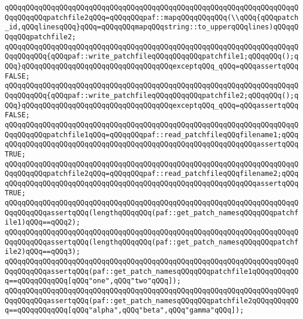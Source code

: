 \verb|qQQqqQQqqQQqqQQqqQQqqQQqqQQqqQQqqQQqqQQqqQQqqQQqqQQqqQQqqQQqqQQqqQQqqQQqqQQqqQQqpatchfile2qQQq=qQQqqQQqpaf::mapqQQqqQQqqQQq(\\qQQq{qQQqpatch_id,qQQqlinesqQQq}qQQq=qQQqqQQqmapqQQqstring::to_upperqQQqlines)qQQqqQQqqQQqpatchfile2;|\newline
\newline
\verb|qQQqqQQqqQQqqQQqqQQqqQQqqQQqqQQqqQQqqQQqqQQqqQQqqQQqqQQqqQQqqQQqqQQqqQQqqQQqqQQq{qQQqpaf::write_patchfileqQQqqQQqqQQqpatchfile1;qQQqqQQq();qQQq}qQQqqQQqqQQqqQQqqQQqqQQqqQQqqQQqqQQqexceptqQQq_qQQq=qQQqassertqQQqFALSE;|\newline
\verb|qQQqqQQqqQQqqQQqqQQqqQQqqQQqqQQqqQQqqQQqqQQqqQQqqQQqqQQqqQQqqQQqqQQqqQQqqQQqqQQq{qQQqpaf::write_patchfileqQQqqQQqqQQqpatchfile2;qQQqqQQq();qQQq}qQQqqQQqqQQqqQQqqQQqqQQqqQQqqQQqqQQqexceptqQQq_qQQq=qQQqassertqQQqFALSE;|\newline
\newline
\newline
\newline
\verb|qQQqqQQqqQQqqQQqqQQqqQQqqQQqqQQqqQQqqQQqqQQqqQQqqQQqqQQqqQQqqQQqqQQqqQQqqQQqqQQqpatchfile1qQQq=qQQqqQQqpaf::read_patchfileqQQqfilename1;qQQqqQQqqQQqqQQqqQQqqQQqqQQqqQQqqQQqqQQqqQQqqQQqqQQqqQQqqQQqqQQqassertqQQqTRUE;|\newline
\verb|qQQqqQQqqQQqqQQqqQQqqQQqqQQqqQQqqQQqqQQqqQQqqQQqqQQqqQQqqQQqqQQqqQQqqQQqqQQqqQQqpatchfile2qQQq=qQQqqQQqpaf::read_patchfileqQQqfilename2;qQQqqQQqqQQqqQQqqQQqqQQqqQQqqQQqqQQqqQQqqQQqqQQqqQQqqQQqqQQqqQQqassertqQQqTRUE;|\newline
\newline
\verb|qQQqqQQqqQQqqQQqqQQqqQQqqQQqqQQqqQQqqQQqqQQqqQQqqQQqqQQqqQQqqQQqqQQqqQQqqQQqqQQqassertqQQq(lengthqQQqqQQq(paf::get_patch_namesqQQqqQQqpatchfile1)qQQq==qQQq2);|\newline
\verb|qQQqqQQqqQQqqQQqqQQqqQQqqQQqqQQqqQQqqQQqqQQqqQQqqQQqqQQqqQQqqQQqqQQqqQQqqQQqqQQqassertqQQq(lengthqQQqqQQq(paf::get_patch_namesqQQqqQQqpatchfile2)qQQq==qQQq3);|\newline
\newline
\verb|qQQqqQQqqQQqqQQqqQQqqQQqqQQqqQQqqQQqqQQqqQQqqQQqqQQqqQQqqQQqqQQqqQQqqQQqqQQqqQQqassertqQQq(paf::get_patch_namesqQQqqQQqpatchfile1qQQqqQQqqQQq==qQQqqQQqqQQq[qQQq"one",qQQq"two"qQQq]);|\newline
\verb|qQQqqQQqqQQqqQQqqQQqqQQqqQQqqQQqqQQqqQQqqQQqqQQqqQQqqQQqqQQqqQQqqQQqqQQqqQQqqQQqassertqQQq(paf::get_patch_namesqQQqqQQqpatchfile2qQQqqQQqqQQq==qQQqqQQqqQQq[qQQq"alpha",qQQq"beta",qQQq"gamma"qQQq]);|\newline
